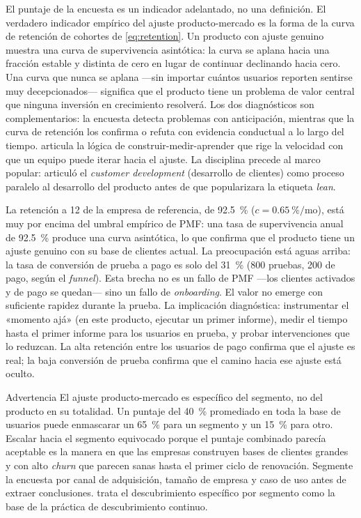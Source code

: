 El puntaje de la encuesta es un indicador adelantado, no una definición. El verdadero
indicador empírico del ajuste producto-mercado es la forma de la curva de retención de
cohortes de \cref{eq:retention}. Un producto con ajuste genuino muestra una curva de
supervivencia asintótica: la curva se aplana hacia una fracción estable y distinta de
cero en lugar de continuar declinando hacia cero. Una curva que nunca se aplana ---sin
importar cuántos usuarios reporten sentirse muy decepcionados--- significa que el producto
tiene un problema de valor central que ninguna inversión en crecimiento resolverá. Los
dos diagnósticos son complementarios: la encuesta detecta problemas con anticipación,
mientras que la curva de retención los confirma o refuta con evidencia conductual a lo
largo del tiempo. \textcite{ries2011} articula la lógica de construir-medir-aprender que
rige la velocidad con que un equipo puede iterar hacia el ajuste. La disciplina precede al marco popular: \textcite{blank2005foursteps} articuló el \emph{customer development} (desarrollo de clientes) como proceso paralelo al desarrollo del producto antes de que \textcite{ries2011} popularizara la etiqueta \emph{lean}.

\begin{example}
La retención a \qty{12}{} de la empresa de referencia, de \qty{92.5}{\percent}
(\(c = \qty{0.65}{\percent}/\text{mo}\)), está muy por encima del umbral empírico de PMF:
una tasa de supervivencia anual de \qty{92.5}{\percent} produce una curva asintótica, lo
que confirma que el producto tiene un ajuste genuino con su base de clientes actual. La
preocupación está aguas arriba: la tasa de conversión de prueba a pago es solo del
\qty{31}{\percent} (800 pruebas, 200 de pago, según el \emph{funnel}). Esta brecha no es
un fallo de PMF ---los clientes activados y de pago se quedan--- sino un fallo de
\emph{onboarding}. El valor no emerge con suficiente rapidez durante la prueba. La
implicación diagnóstica: instrumentar el «momento ajá» (en este producto, ejecutar un
primer informe), medir el tiempo hasta el primer informe para los usuarios en prueba, y
probar intervenciones que lo reduzcan. La alta retención entre los usuarios de pago
confirma que el ajuste es real; la baja conversión de prueba confirma que el camino
hacia ese ajuste está oculto.
\end{example}

\begin{admonition}{Advertencia}
El ajuste producto-mercado es específico del segmento, no del producto en su totalidad.
Un puntaje del \qty{40}{\percent} promediado en toda la base de usuarios puede enmascarar
un \qty{65}{\percent} para un segmento y un \qty{15}{\percent} para otro. Escalar hacia
el segmento equivocado porque el puntaje combinado parecía aceptable es la manera en que
las empresas construyen bases de clientes grandes y con alto \emph{churn} que parecen
sanas hasta el primer ciclo de renovación. Segmente la encuesta por canal de adquisición,
tamaño de empresa y caso de uso antes de extraer conclusiones.
\textcite{torres2021continuous} trata el descubrimiento específico por segmento como la
base de la práctica de descubrimiento continuo.
\end{admonition}

